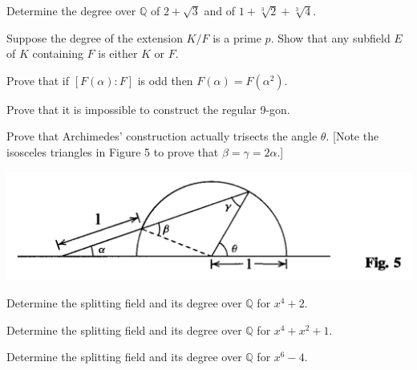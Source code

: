 \documentclass[12pt,letterpaper]{hmcpset}
\newcommand{\Qq}{\mathbb{Q}}
\begin{document}

\begin{problem}[13.2.4]
  Determine the degree over $\Qq$ of $2+\sqrt{3}$ and of $1 + \sqrt[3]{2} + \sqrt[3]{4}.$
\end{problem}
\begin{solution}
\vfill
\end{solution}
\newpage

\begin{problem}[13.2.12]
  Suppose the degree of the extension $K/F$ is a prime $p$. Show that any subfield $E$ of $K$ containing $F$ is either $K$ or $F$.
\end{problem}
\begin{solution}
	\vfill
\end{solution}
\newpage

\begin{problem}[13.2.14]
  Prove that if $[F(\alpha) : F]$ is odd then $F(\alpha) = F(\alpha^2).$
\end{problem}
\begin{solution}
	\vfill
\end{solution}
\newpage

\begin{problem}[13.3.1]
	Prove that it is impossible to construct the regular 9-gon.
\end{problem}
\begin{solution}
	\vfill
\end{solution}
\newpage

\begin{problem}
	Prove that Archimedes' construction actually trisects the angle $\theta$. [Note the isosceles triangles in Figure 5 to prove that $\beta = \gamma = 2\alpha$.]
	\begin{center}
		\includegraphics[scale=0.5]{13-3fig5.png}
	\end{center}
\end{problem}

\begin{problem}[13.4.2]
	Determine the splitting field and its degree over $\Qq$ for $x^4 + 2$.
\end{problem}
\begin{solution}
	\vfill
\end{solution}
\newpage

\begin{problem}[13.4.3]
	Determine the splitting field and its degree over $\Qq$ for $x^4 + x^2 + 1$.
\end{problem}
\begin{solution}
	\vfill
\end{solution}
\newpage

\begin{problem}
	Determine the splitting field and its degree over $\Qq$ for $x^6 - 4$.
\end{problem}
\end{document}
